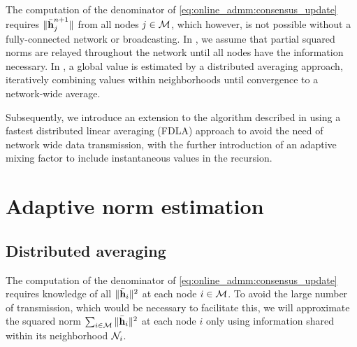 \documentclass{article}
\begin{document}
The computation of the denominator of \eqref{eq:online_admm:consensus_update} requires  \(\|\bar{\bm{\mathrm{h}}}_j^{n+1}\|\) from all nodes \(j \in \mathcal{M}\), which however, is not possible without a fully-connected network or broadcasting.
In \cite{blochbergerDBSI}, we assume that partial squared norms are relayed throughout the network until all nodes have the information necessary.
In \cite{yuDistributedBlindSystem2014,liuDistributedBlindIdentification2016}, a global value is estimated by a distributed averaging approach, iteratively combining values within neighborhoods until convergence to a network-wide average.

Subsequently, we introduce an extension to the algorithm described in \cite{blochbergerDBSI} using a fastest distributed linear averaging (FDLA) approach \cite{xiaoFastLinearIterations2004} to avoid the need of network wide data transmission, with the further introduction of an adaptive mixing factor to include instantaneous values in the recursion.

\section{Adaptive norm estimation}
\label{sec:adaptivenormest}

\subsection[]{Distributed averaging}
The computation of the denominator of \eqref{eq:online_admm:consensus_update} requires knowledge of all \(\|\bar{\bm{\mathrm{h}}}_i\|^2\) at each node \(i \in \mathcal{M}\).
To avoid the large number of transmission, which would be necessary to facilitate this, we will approximate the squared norm \(\sum_{i \in \mathcal{M}} \|\bar{\bm{\mathrm{h}}}_i\|^2\) at each node \(i\) only using information shared within its neighborhood \(\mathcal{N}_i\).
\end{document}
